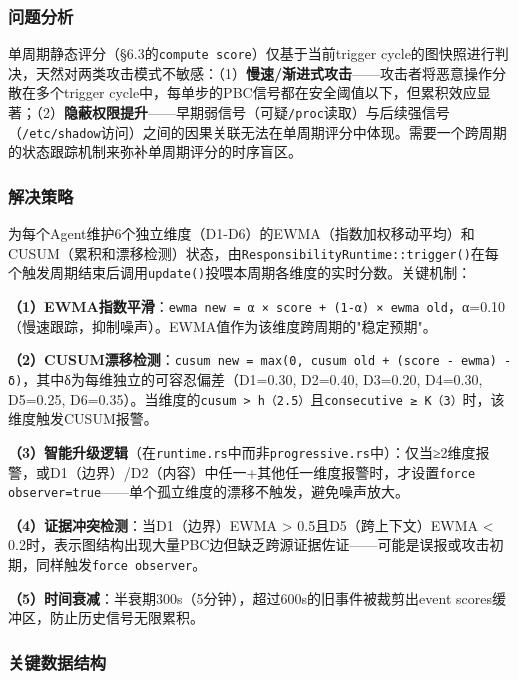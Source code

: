 \documentclass[a4paper]{ctexart}
\makeatletter
\renewcommand{\_}{%
  \ifmmode
    \nfss@text{\textunderscore}%
  \else
    \textunderscore\discretionary{}{}{}%
  \fi}
\makeatother
\begin{document}
\subsubsection{问题分析}



单周期静态评分（§6.3的\texttt{compute\_score}）仅基于当前trigger cycle的图快照进行判决，天然对两类攻击模式不敏感：（1）\textbf{慢速/渐进式攻击}——攻击者将恶意操作分散在多个trigger cycle中，每单步的PBC信号都在安全阈值以下，但累积效应显著；（2）\textbf{隐蔽权限提升}——早期弱信号（可疑\texttt{/proc}读取）与后续强信号（\texttt{/etc/shadow}访问）之间的因果关联无法在单周期评分中体现。需要一个跨周期的状态跟踪机制来弥补单周期评分的时序盲区。


\subsubsection{解决策略}



为每个Agent维护6个独立维度（D1-D6）的EWMA（指数加权移动平均）和CUSUM（累积和漂移检测）状态，由\texttt{ResponsibilityRuntime::trigger()}在每个触发周期结束后调用\texttt{update()}投喂本周期各维度的实时分数。关键机制：


\textbf{（1）EWMA指数平滑}：\texttt{ewma\_new = α × score + (1-α) × ewma\_old}，α=0.10（慢速跟踪，抑制噪声）。EWMA值作为该维度跨周期的"稳定预期"。


\textbf{（2）CUSUM漂移检测}：\texttt{cusum\_new = max(0, cusum\_old + (score - ewma) - δ)}，其中δ为每维独立的可容忍偏差（D1=0.30, D2=0.40, D3=0.20, D4=0.30, D5=0.25, D6=0.35）。当维度的\texttt{cusum > h（2.5）}且\texttt{consecutive ≥ K（3）}时，该维度触发CUSUM报警。


\textbf{（3）智能升级逻辑}（在\texttt{runtime.rs}中而非\texttt{progressive.rs}中）：仅当≥2维度报警，或D1（边界）/D2（内容）中任一+其他任一维度报警时，才设置\texttt{force\_observer=true}——单个孤立维度的漂移不触发，避免噪声放大。


\textbf{（4）证据冲突检测}：当D1（边界）EWMA > 0.5且D5（跨上下文）EWMA < 0.2时，表示图结构出现大量PBC边但缺乏跨源证据佐证——可能是误报或攻击初期，同样触发\texttt{force\_observer}。


\textbf{（5）时间衰减}：半衰期300s（5分钟），超过600s的旧事件被裁剪出event\_scores缓冲区，防止历史信号无限累积。


\subsubsection{关键数据结构}
\end{document}

